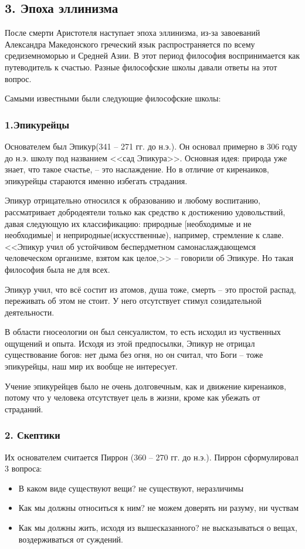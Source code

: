 \documentclass[a4paper, 12pt]{book} %
\begin{document}
\subsection*{3. Эпоха эллинизма}
После смерти Аристотеля наступает эпоха эллинизма, из-за завоеваний Александра Македонского греческий язык распространяется по всему средиземноморью и Средней Азии. В этот период философия воспринимается как путеводитель к счастью. Разные философские школы давали ответы на этот вопрос.

Самыми известными были следующие философские школы:

\subsubsection*{1.Эпикурейцы}
Основателем был Эпикур(341 -- 271 гг. до н.э.). Он основал примерно в 306 году до н.э. школу под названием <<сад Эпикура>>. Основная идея: природа уже знает, что такое счастье, -- это наслаждение. Но в отличие от киренаиков, эпикурейцы стараются именно избегать страдания. 

Эпикур отрицательно относился к образованию и любому воспитанию, рассматривает добродеятели только как средство к достижению удовольствий, давая следующую их классификацию:
природные [необходимые и не необходимые] и неприродные(искусственные), например, стремление к славе. <<Эпикур учил об устойчивом беспердметном самонаслаждающемся человеческом организме, взятом как целое,>> -- говорили об Эпикуре. Но такая философия была не для всех. 

Эпикур учил, что всё состит из атомов, душа тоже, смерть -- это простой распад, переживать об этом не стоит. У него отсутствует стимул созидательной деятельности. 

В области гносеологии он был сенсуалистом, то есть исходил из чуственных ощущений и опыта. Исходя из этой предпосылки, Эпикур не отрицал существование богов: нет дыма без огня, но он считал, что Боги -- тоже эпикурейцы, наш мир их вообще не интересует.

Учение эпикурейцев было не очень долговечным, как и движение киренаиков, потому что у человека отсутствует цель в жизни, кроме как убежать от страданий.

\subsubsection*{2. Скептики	}
Их основателем считается Пиррон (360 -- 270 гг. до н.э.). Пиррон сформулировал 3 вопроса:
\begin{itemize}
\item В каком виде существуют вещи? не существуют, неразличимы
\item Как мы должны относиться к ним?  не можем доверять ни разуму, ни чуствам
\item Как мы должны жить, исходя из вышесказанного? не высказываться о вещах, воздерживаться от суждений. 
\end{itemize}
\end{document}
